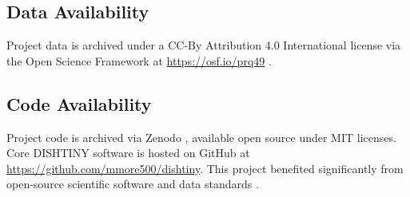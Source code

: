 \subsection{Data Availability}

Project data is archived under a CC-By Attribution 4.0 International license via the Open Science Framework at \url{https://osf.io/prq49} \citep{foster2017open}.

\subsection{Code Availability}

Project code is archived via Zenodo \citep{moreno_2025_16990564}, available open source under MIT licenses.
Core DISHTINY software is hosted on GitHub at \url{https://github.com/mmore500/dishtiny}.
This project benefited significantly from open-source scientific software and data standards \citep{2020SciPy-NMeth,harris2020array,reback2020pandas,mckinney-proc-scipy-2010,waskom2021seaborn,hunter2007matplotlib,moreno2023teeplot,seabold2010statsmodels,vostinar2024empirical,moreno2021signalgp,moreno2021conduit,cock2009biopython,lalejini2019data}.
